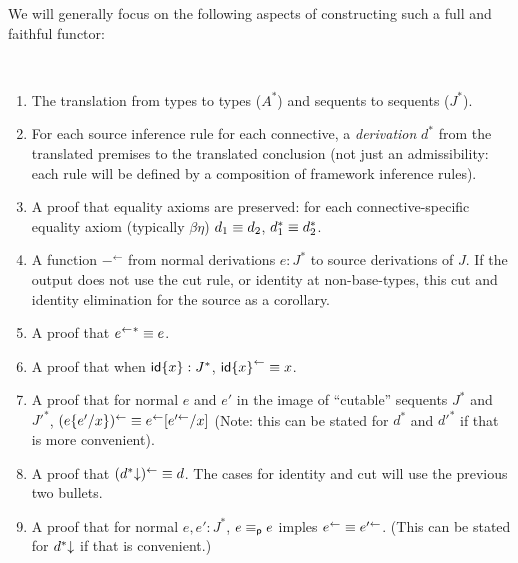 \newcommand\backtrf[1]{\ensuremath{#1^{\leftarrow}}}
\newcommand\backtr[1]{\ensuremath{#1^{\Leftarrow}}}
\newcommand\str[2]{\ensuremath{\dsd{str}_{#1}(#2)}}

We will generally focus on the following aspects of constructing such a
full and faithful functor:
\begin{definition} ~
\begin{enumerate}
\item The translation from types to types ($A^*$) and sequents to
  sequents ($J^*$).

\item For each source inference rule for each connective, a
  \emph{derivation} $d^*$ from the translated premises to the translated
  conclusion (not just an admissibility: each rule will be defined by a
  composition of framework inference rules).

\item A proof that equality axioms are preserved: for each
  connective-specific equality axiom (typically $\beta\eta$) $d_1 \equiv
  d_2$, $d_1^* \equiv d_2^*$.

\item A function \backtrf{-} from normal derivations $e : J^*$ to source
  derivations of $J$.  If the output does not use the cut rule, or
  identity at non-base-types, this cut and identity elimination for the
  source as a corollary.

\item A proof that ${\backtrf{e}}^* \deq e$.  

\item A proof that when ${\mathsf{id}\{x\}} : J^*$, $\backtrf{\Identa{x}} \deq
  x$.

\item A proof that for normal $e$ and $e'$ in the image of ``cutable''
  sequents $J^*$ and $J'^*$, $\backtrf{(\Cuta{e}{e'}{x})} \deq
  \backtrf{e}[\backtrf{e'}/x]$ (Note: this can be stated for $d^*$ and
  $d'^*$ if that is more convenient).

\item A proof that $\backtrf{(\elim{d^*})} \deq d$.  The cases for
  identity and cut will use the previous two bullets.

\item A proof that for normal $e,e' : J^*$, $e \equiv_{\mathsf{p}} e$ imples
  $\backtrf{e} \deq \backtrf{e'}$.  (This can be stated for
  $d^*\mathord{\downarrow}$ if that is convenient.)
\end{enumerate}
\end{definition}

